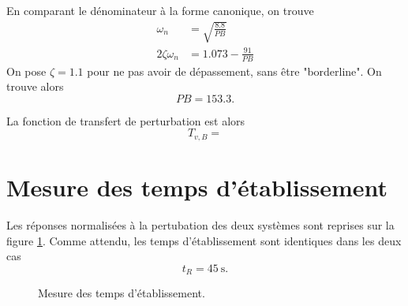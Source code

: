 \documentclass[frenchb, paper=a4, fontsize=11pt]{scrartcl}
\numberwithin{equation}{section}					%
\numberwithin{figure}{section}					%
\numberwithin{table}{section}						%
\begin{document}
En comparant le dénominateur à la forme canonique, on trouve
\begin{align*}
\omega_n &= \sqrt{\frac{8.8}{PB}}\\
2\zeta \omega_n &= 1.073-\frac{91}{PB} 
\end{align*}
On pose $\zeta=1.1$ pour ne pas avoir de dépassement, sans être "borderline". On trouve alors 
\begin{equation}
PB=153.3.
\end{equation}

La fonction de transfert de perturbation est alors
\begin{equation}
T_{v,B} = 
\end{equation}



\section{Mesure des temps d'établissement}
Les réponses normalisées à la pertubation des deux systèmes sont
reprises sur la figure \ref{fig:settling-time}. Comme attendu,
les temps d'établissement sont identiques dans les deux cas
\begin{equation}
	t_R = \SI{45}{\second}.
\end{equation}

\begin{figure}[ht]
	\centering
	
	\caption{Mesure des temps d'établissement.}
	\label{fig:settling-time}
\end{figure}
\end{document}

